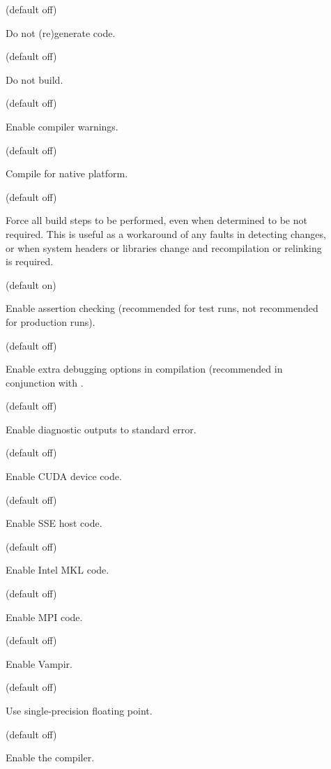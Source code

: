 \begin{description}
\item[] (default off)

Do not (re)generate code.

\item[] (default off)

Do not build.

\item[] (default off)

Enable compiler warnings.

\item[] (default off)

Compile for native platform.

\item[] (default off)

Force all build steps to be performed, even when determined to be not
required. This is useful as a workaround of any faults in detecting
changes, or when system headers or libraries change and recompilation or
relinking is required.

\item[] (default on)

Enable assertion checking (recommended for test runs, not recommended for
production runs).

\item[] (default off)

Enable extra debugging options in compilation (recommended in conjunction with
.

\item[] (default off)

Enable diagnostic outputs to standard error.

\item[] (default off)

Enable CUDA device code.

\item[] (default off)

Enable SSE host code.

\item[] (default off)

Enable Intel MKL code.

\item[] (default off)

Enable MPI code.

\item[] (default off)

Enable Vampir.

\item[] (default off)

Use single-precision floating point.

\item[] (default off)

Enable the  compiler.
\end{description}

